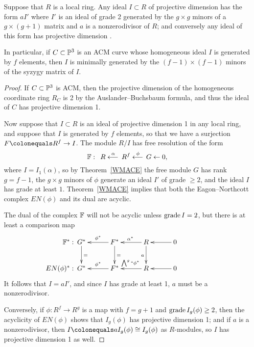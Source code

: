 \begin{corollary}\label{Hilbert--Burch}
Suppose that $R$ is a local ring. Any ideal $I\subset R$ of projective
%
dimension \1 has the form
$aI'$ where $I'$ is an ideal of grade 2 generated by the $g\times g$
minors
of a $g \times (g+1)$ matrix and $a$ is a nonzerodivisor of $R$; and
conversely any ideal of this form
has projective dimension \1.

%
In particular, if $C\subset \PP^{3}$ is an 
ACM curve
%
whose homogeneous
ideal $I$ is generated by
$f$ elements, then $I$ is minimally generated by the $(f-1)\times (f-1)$
minors of the 
syzygy matrix
%
 of $I$.
\unif
\end{corollary}

\begin{proof}
If $C\subset \PP^{3}$ is ACM, then the projective dimension of the
homogeneous coordinate ring $R_{C}$
is 2  by the 
Auslander--Buchsbaum formula,
%
and thus the ideal of $C$
has projective dimension 1.

Now suppose that $I\subset R$ is an ideal of projective dimension 1 in
any local ring, and suppose
that $I$ is generated by $f$ elements, so that we have a surjection
$F\colonequals  R^{f} \to I$.  The module $R/I$
has free resolution of the form
$$
\FF:\quad R\luto{\ \alpha} R^{f}\luto{\ \phi} G\leftarrow 0,
$$
where $I = I_{1}(\alpha)$, so by Theorem~\ref{WMACE} the free module $G$
has rank $g = f-1$, the $g\times g$
minors of $\phi$ generate an ideal $I'$ of grade $\geq 2$, and the ideal
$I$ has grade 
at least
$1$. Theorem~\ref{WMACE} implies
that both the Eagon--Northcott complex $EN(\phi)$
and its dual are acyclic.

The dual of the complex $\FF$ will not be acyclic unless 
$\grade I = 2$, but there is at least a comparison map
\vspace*{-5pt}
$$
\xymatrix@C=30pt{
\llap{$\FF^{*}:\quad$}
G^{*}\ar[d]^=&F^*\ar[l]_{\phi^*}\ar[d]^=&R\ar[l]_{\alpha^*}\ar[d]_a &0\ar[l]\\
\llap{$EN(\phi)^{*}:\quad$}
G^{*}&F^*\ar[l]_{\phi^*}&R\ar[l]_{\ssty\bigwedge^g``\phi^{*}}&0\ar[l] \\
}
$$
It follows that $I = aI'$, and since $I$ has grade at least 1, $a$ must be a
nonzerodivisor.

Conversely, if $\phi: R^{f}\to R^{g}$ is a map with $f = g+1$ and $\grade
I_{g}(\phi)\geq 2$,
then the acyclicity of $EN(\phi)$ shows that $I_{g}(\phi)$ has projective
dimension 1; and if
$a$ is a 
nonzerodivisor,
%
then $I \colonequals  aI_{g}(\phi) \cong
I_{g}(\phi)$ as $R$-modules, so
$I$ has projective dimension 1 as well.
\unif
\end{proof}

